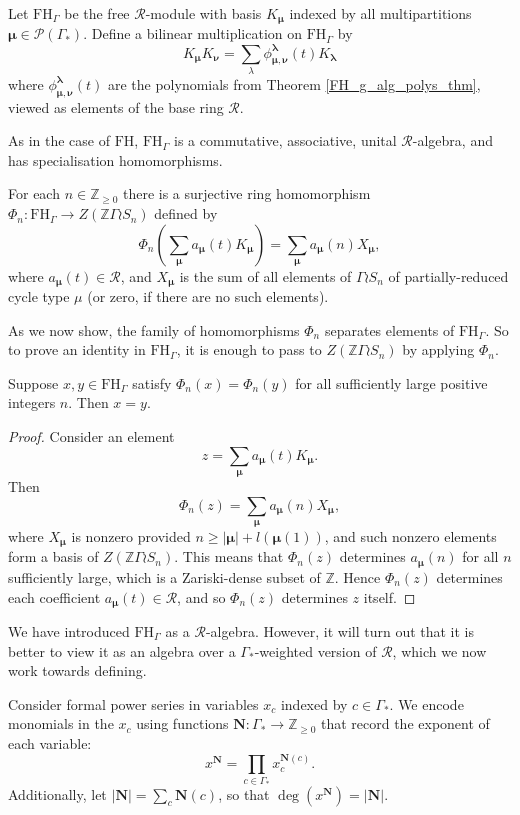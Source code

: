 \documentclass[ALCO,Unicode]{cedram}
\newcommand{\bs}{\boldsymbol}
\newcommand{\FH}{\mathrm{FH}}
\newcommand{\FHG}{\mathrm{FH}_{\Gamma}}
\newcommand{\FH}{\mathrm{FH}}
\newcommand{\FHG}{\mathrm{FH}_{\Gamma}}
\begin{document}
\begin{definition} 
Let $\FHG$ be the free $\mathcal{R}$-module with basis $K_{\bs \mu}$ indexed by all multipartitions $\bs \mu \in \mathcal{P}(\Gamma_*)$. Define a bilinear multiplication on $\FHG$ by
\[
K_{\bs \mu} K_{\bs \nu} = \sum_{\lambda} \phi_{\bs\mu, \bs\nu}^{\bs\lambda}(t) K_{\bs \lambda}
\]
where $\phi_{\bs\mu, \bs\nu}^{\bs\lambda}(t)$ are the polynomials from Theorem \ref{FH_g_alg_polys_thm}, viewed as elements of the base ring $\mathcal{R}$.
\end{definition}

As in the case of $\FH$, $\FHG$ is a commutative, associative, unital $\mathcal{R}$-algebra, and has specialisation homomorphisms.
\begin{theorem}  \label{thm:FH_g_spec_hom}
For each $n \in \mathbb{Z}_{\geq 0}$ there is a surjective ring homomorphism $\Phi_n: \FHG \to Z(\mathbb{Z}\Gamma \wr S_n)$ defined by
\[
\Phi_n \left( \sum_{\bs \mu} a_{\bs \mu}(t) K_{\bs\mu} \right) = \sum_{\bs \mu} a_{\bs \mu}(n) X_{\bs \mu},
\]
where $a_{\bs\mu}(t) \in \mathcal{R}$, and $X_{\bs\mu}$ is the sum of all elements of $\Gamma \wr S_n$ of partially-reduced cycle type $\mu$ \textup{(}or zero, if there are no such elements\textup{)}.
\end{theorem}

As we now show, the family of homomorphisms $\Phi_n$ separates elements of $\FHG$. So to prove an identity in $\FHG$, it is enough to pass to $Z(\mathbb{Z}\Gamma \wr S_n)$ by applying $\Phi_n$.
\begin{proposition} \label{specialisation_distinguishing_prop}
Suppose $x,y \in \FHG$ satisfy $\Phi_n(x) = \Phi_n(y)$ for all sufficiently large positive integers $n$. Then $x=y$.
\end{proposition}
\begin{proof}
Consider an element
\[
z = \sum_{\bs \mu} a_{\bs \mu}(t) K_{\bs\mu}.
\]
Then
\[
\Phi_n \left(z \right) = \sum_{\bs \mu} a_{\bs \mu}(n) X_{\bs \mu},
\]
where $X_{\bs \mu}$ is nonzero provided $n \geq |\bs \mu| + l(\bs \mu(1))$, and such nonzero elements form a basis of $Z(\mathbb{Z}\Gamma \wr S_n)$. This means that $\Phi_n(z)$ determines $a_{\bs \mu}(n)$ for all $n$ sufficiently large, which is a Zariski-dense subset of $\mathbb{Z}$. Hence $\Phi_n(z)$ determines each coefficient $a_{\bs \mu}(t) \in \mathcal{R}$, and so $\Phi_n(z)$ determines $z$ itself. 
\end{proof}

We have introduced $\FHG$ as a $\mathcal{R}$-algebra. However, it will turn out that it is better to view it as an algebra over a $\Gamma_*$-weighted version of $\mathcal{R}$, which we now work towards defining.
\begin{definition}
Consider formal power series in variables $x_c$ indexed by $c \in \Gamma_*$. We encode monomials in the $x_c$ using functions $\mathbf{N}: \Gamma_* \to \mathbb{Z}_{\geq 0}$ that record the exponent of each variable:
\[
x^{\mathbf{N}} = \prod_{c \in \Gamma_*} x_c^{\mathbf{N}(c)}.
\]
Additionally, let $|\mathbf{N}| = \sum_c \mathbf{N}(c)$, so that $\deg(x^{\mathbf{N}}) = |\mathbf{N}|$.
\end{definition}
\end{document}
